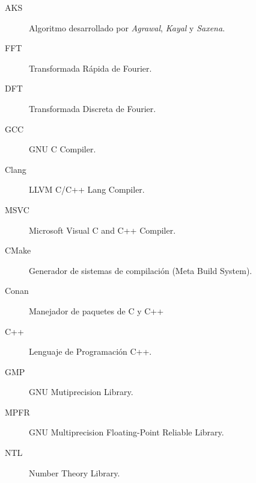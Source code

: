 \begin{description}
	\item[AKS] Algoritmo desarrollado por \textit{Agrawal}, \textit{Kayal} y \textit{Saxena}.
	
	\item[FFT] Transformada Rápida de Fourier.
	
	\item[DFT] Transformada Discreta de Fourier.
	
	\item[GCC] GNU C Compiler.
	
	\item[Clang] LLVM C/C++ Lang Compiler.
	
	\item[MSVC] Microsoft Visual C and C++ Compiler.
	
	\item[CMake] Generador de sistemas de compilación (Meta Build System).
	
	\item[Conan] Manejador de paquetes de C y C++
	
	\item[C++] Lenguaje de Programación C++.
	
	\item[GMP] GNU Mutiprecision Library.
	
	\item[MPFR] GNU Multiprecision Floating-Point Reliable Library.
	
	\item[NTL] Number Theory Library.
\end{description}
\endinput
